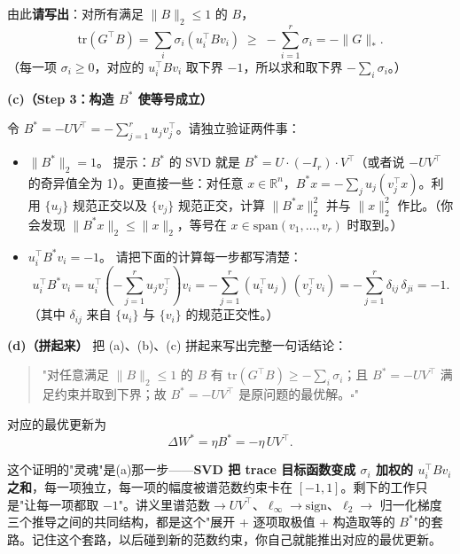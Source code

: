 \documentclass[12pt,a4paper]{article}
\begin{document}
由此\textbf{请写出}：对所有满足 $\|B\|_2 \le 1$ 的 $B$，
\[
\mathrm{tr}(G^\top B) = \sum_i \sigma_i (u_i^\top B v_i) \;\ge\; -\sum_{i=1}^r \sigma_i = -\|G\|_*.
\]
（每一项 $\sigma_i \ge 0$，对应的 $u_i^\top B v_i$ 取下界 $-1$，所以求和取下界 $-\sum_i \sigma_i$。）

\textbf{(c)（Step 3：构造 $B^*$ 使等号成立）}

令 $B^* = -UV^\top = -\sum_{j=1}^r u_j v_j^\top$。请独立验证两件事：

\begin{itemize}[leftmargin=*,nosep]
  \item[(c1)] $\|B^*\|_2 = 1$。
  提示：$B^*$ 的 SVD 就是 $B^* = U \cdot (-I_r) \cdot V^\top$（或者说 $-UV^\top$ 的奇异值全为 1）。更直接一些：对任意 $x \in \mathbb{R}^n$，$B^* x = -\sum_j u_j (v_j^\top x)$。利用 $\{u_j\}$ 规范正交以及 $\{v_j\}$ 规范正交，计算 $\|B^* x\|_2^2$ 并与 $\|x\|_2^2$ 作比。（你会发现 $\|B^* x\|_2 \le \|x\|_2$，等号在 $x \in \mathrm{span}(v_1, \ldots, v_r)$ 时取到。）
  
  \item[(c2)] $u_i^\top B^* v_i = -1$。
  请把下面的计算每一步都写清楚：
  \[
  u_i^\top B^* v_i
  = u_i^\top \left(-\sum_{j=1}^r u_j v_j^\top\right) v_i
  = -\sum_{j=1}^r (u_i^\top u_j)\,(v_j^\top v_i)
  = -\sum_{j=1}^r \delta_{ij}\,\delta_{ji}
  = -1.
  \]
  （其中 $\delta_{ij}$ 来自 $\{u_i\}$ 与 $\{v_i\}$ 的规范正交性。）
\end{itemize}

\textbf{(d)（拼起来）} 把 (a)、(b)、(c) 拼起来写出完整一句话结论：

\begin{quote}
"对任意满足 $\|B\|_2 \le 1$ 的 $B$ 有 $\mathrm{tr}(G^\top B) \ge -\sum_i \sigma_i$；且 $B^* = -UV^\top$ 满足约束并取到下界；故 $B^* = -UV^\top$ 是原问题的最优解。$\square$"
\end{quote}

对应的最优更新为
\[
\boxed{\;\Delta W^* = \eta B^* = -\eta\, U V^\top.\;}
\]

\begin{thinkbox}
这个证明的"灵魂"是(a)那一步——\textbf{SVD 把 trace 目标函数变成 $\sigma_i$ 加权的 $u_i^\top B v_i$ 之和}，每一项独立，每一项的幅度被谱范数约束卡在 $[-1, 1]$。剩下的工作只是"让每一项都取 $-1$"。讲义里谱范数$\to UV^\top$、$\ell_\infty \to \mathrm{sign}$、$\ell_2\to$ 归一化梯度三个推导之间的共同结构，都是这个"展开 + 逐项取极值 + 构造取等的 $B^*$"的套路。记住这个套路，以后碰到新的范数约束，你自己就能推出对应的最优更新。
\end{thinkbox}
\end{document}
